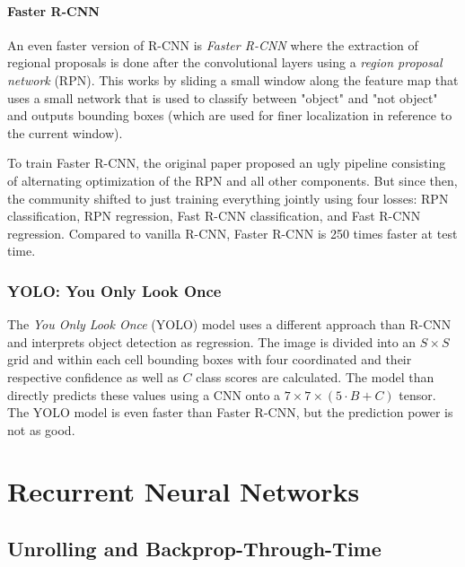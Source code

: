 			\subsubsection{Faster R-CNN}
				An even faster version of R-CNN is \emph{Faster R-CNN} where the extraction of regional proposals is done after the convolutional layers using a \emph{region proposal network} (RPN). This works by sliding a small window along the feature map that uses a small network that is used to classify between "object" and "not object" and outputs bounding boxes (which are used for finer localization in reference to the current window).

				To train Faster R-CNN, the original paper proposed an ugly pipeline consisting of alternating optimization of the RPN and all other components. But since then, the community shifted to just training everything jointly using four losses: RPN classification, RPN regression, Fast R-CNN classification, and Fast R-CNN regression. Compared to vanilla R-CNN, Faster R-CNN is \num{250} times faster at test time.

		\subsection{YOLO: You Only Look Once}
			The \emph{You Only Look Once} (YOLO) model uses a different approach than R-CNN and interprets object detection as regression. The image is divided into an \(S \times S\) grid and within each cell bounding boxes with four coordinated and their respective confidence as well as \(C\) class scores are calculated. The model than directly predicts these values using a CNN onto a \( 7 \times 7 \times (5 \cdot B + C) \) tensor. The YOLO model is even faster than Faster R-CNN, but the prediction power is not as good.

\chapter{Recurrent Neural Networks} %

	\section{Unrolling and Backprop-Through-Time} %

